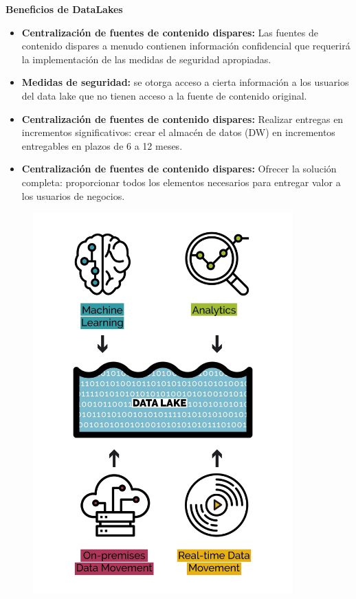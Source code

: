 \documentclass[%
 reprint,
 amsmath,amssymb,
 aps,
]{revtex4-1}
\begin{document}
\textbf{Beneficios de DataLakes}
\begin{itemize}
	\item \textbf{ Centralización de fuentes de contenido dispares:} Las fuentes de contenido dispares a menudo contienen información confidencial que requerirá la implementación de las medidas de seguridad apropiadas.
	\item  \textbf{ Medidas de seguridad:} se otorga acceso a cierta información a los usuarios del data lake que no tienen acceso a la fuente de contenido original. 
	\item  \textbf{ Centralización de fuentes de contenido dispares:} Realizar entregas en incrementos significativos: crear el almacén de datos (DW) en incrementos entregables en plazos de 6 a 12 meses.
	\item  \textbf{ Centralización de fuentes de contenido dispares:} Ofrecer la solución completa: proporcionar todos los elementos necesarios para entregar valor a los usuarios de negocios. 
\end{itemize}

\begin{figure}[htb]
				\begin{center}
					\includegraphics[width=10cm]{./IMAGENES/datalake}
				\end{center}
			\end{figure}
\end{document}
